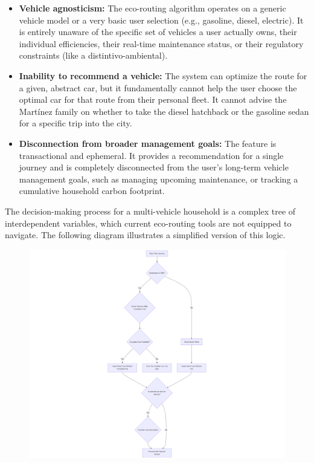 \begin{itemize}
    \item \textbf{Vehicle agnosticism:} The eco-routing algorithm operates on a generic vehicle model or a very basic user selection (e.g., gasoline, diesel, electric). It is entirely unaware of the specific set of vehicles a user actually owns, their individual efficiencies, their real-time maintenance status, or their regulatory constraints (like a \gls{distintivo-ambiental}).
    
    \textgap
    
    \item \textbf{Inability to recommend a vehicle:} The system can optimize the route for a given, abstract car, but it fundamentally cannot help the user choose the optimal car for that route from their personal fleet. It cannot advise the Martínez family on whether to take the diesel hatchback or the gasoline sedan for a specific trip into the city.
    
    \textgap
    
    \item \textbf{Disconnection from broader management goals:} The feature is transactional and ephemeral. It provides a recommendation for a single journey and is completely disconnected from the user's long-term vehicle management goals, such as managing upcoming maintenance, or tracking a cumulative household carbon footprint.
\end{itemize}

\textgap

The decision-making process for a multi-vehicle household is a complex tree of interdependent variables, which current eco-routing tools are not equipped to navigate. The following diagram illustrates a simplified version of this logic.

\textgap

\begin{figure}[H]
    \centering
    \includegraphics[width=1\textwidth]{images/background/simplified-decision-flow.png}
\end{figure}

